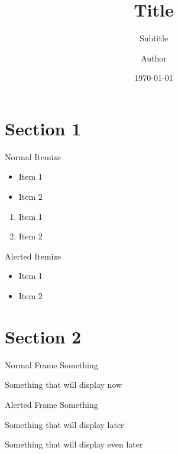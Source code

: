 \documentclass{beamer}
\title{Title}
\subtitle{Subtitle}
\author{Author}
\institute
{
  Università di Pisa
}
\date{\today}
\begin{document}
\firstpage %

\indexoverview %

\section{Section 1}

\sectionoverview %

\begin{frame}{Normal Itemize} %
    \begin{itemize}
        \item Item 1
        \item Item 2
    \end{itemize}
    \begin{enumerate}
        \item Item 1
        \item Item 2
    \end{enumerate}
\end{frame}

\begin{frame}{Alerted Itemize} %
    \begin{itemize} [<+-| alert@+>]
        \item Item 1
        \item Item 2
    \end{itemize}
\end{frame}

\section{Section 2}

\sectionoverview %

\begin{frame}{Normal Frame}
Something

Something that will display now
\end{frame}

\begin{frame}{Alerted Frame} %
Something

\pause
\alert{Something that will display later}

\pause
\alert{Something that will display even later}
\end{frame}
\end{document}
